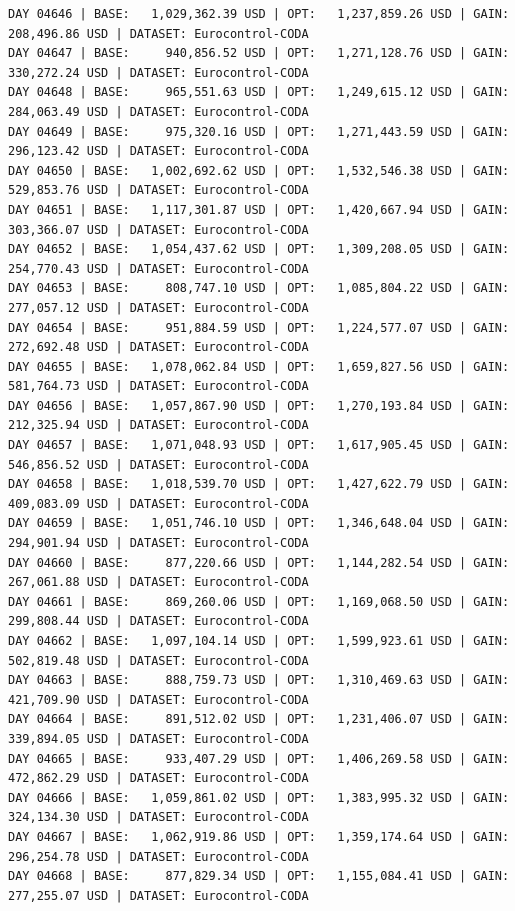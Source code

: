 \documentclass[11pt,a4paper]{article}
\begin{document}
\begin{verbatim}
DAY 04646 | BASE:   1,029,362.39 USD | OPT:   1,237,859.26 USD | GAIN: 208,496.86 USD | DATASET: Eurocontrol-CODA
DAY 04647 | BASE:     940,856.52 USD | OPT:   1,271,128.76 USD | GAIN: 330,272.24 USD | DATASET: Eurocontrol-CODA
DAY 04648 | BASE:     965,551.63 USD | OPT:   1,249,615.12 USD | GAIN: 284,063.49 USD | DATASET: Eurocontrol-CODA
DAY 04649 | BASE:     975,320.16 USD | OPT:   1,271,443.59 USD | GAIN: 296,123.42 USD | DATASET: Eurocontrol-CODA
DAY 04650 | BASE:   1,002,692.62 USD | OPT:   1,532,546.38 USD | GAIN: 529,853.76 USD | DATASET: Eurocontrol-CODA
DAY 04651 | BASE:   1,117,301.87 USD | OPT:   1,420,667.94 USD | GAIN: 303,366.07 USD | DATASET: Eurocontrol-CODA
DAY 04652 | BASE:   1,054,437.62 USD | OPT:   1,309,208.05 USD | GAIN: 254,770.43 USD | DATASET: Eurocontrol-CODA
DAY 04653 | BASE:     808,747.10 USD | OPT:   1,085,804.22 USD | GAIN: 277,057.12 USD | DATASET: Eurocontrol-CODA
DAY 04654 | BASE:     951,884.59 USD | OPT:   1,224,577.07 USD | GAIN: 272,692.48 USD | DATASET: Eurocontrol-CODA
DAY 04655 | BASE:   1,078,062.84 USD | OPT:   1,659,827.56 USD | GAIN: 581,764.73 USD | DATASET: Eurocontrol-CODA
DAY 04656 | BASE:   1,057,867.90 USD | OPT:   1,270,193.84 USD | GAIN: 212,325.94 USD | DATASET: Eurocontrol-CODA
DAY 04657 | BASE:   1,071,048.93 USD | OPT:   1,617,905.45 USD | GAIN: 546,856.52 USD | DATASET: Eurocontrol-CODA
DAY 04658 | BASE:   1,018,539.70 USD | OPT:   1,427,622.79 USD | GAIN: 409,083.09 USD | DATASET: Eurocontrol-CODA
DAY 04659 | BASE:   1,051,746.10 USD | OPT:   1,346,648.04 USD | GAIN: 294,901.94 USD | DATASET: Eurocontrol-CODA
DAY 04660 | BASE:     877,220.66 USD | OPT:   1,144,282.54 USD | GAIN: 267,061.88 USD | DATASET: Eurocontrol-CODA
DAY 04661 | BASE:     869,260.06 USD | OPT:   1,169,068.50 USD | GAIN: 299,808.44 USD | DATASET: Eurocontrol-CODA
DAY 04662 | BASE:   1,097,104.14 USD | OPT:   1,599,923.61 USD | GAIN: 502,819.48 USD | DATASET: Eurocontrol-CODA
DAY 04663 | BASE:     888,759.73 USD | OPT:   1,310,469.63 USD | GAIN: 421,709.90 USD | DATASET: Eurocontrol-CODA
DAY 04664 | BASE:     891,512.02 USD | OPT:   1,231,406.07 USD | GAIN: 339,894.05 USD | DATASET: Eurocontrol-CODA
DAY 04665 | BASE:     933,407.29 USD | OPT:   1,406,269.58 USD | GAIN: 472,862.29 USD | DATASET: Eurocontrol-CODA
DAY 04666 | BASE:   1,059,861.02 USD | OPT:   1,383,995.32 USD | GAIN: 324,134.30 USD | DATASET: Eurocontrol-CODA
DAY 04667 | BASE:   1,062,919.86 USD | OPT:   1,359,174.64 USD | GAIN: 296,254.78 USD | DATASET: Eurocontrol-CODA
DAY 04668 | BASE:     877,829.34 USD | OPT:   1,155,084.41 USD | GAIN: 277,255.07 USD | DATASET: Eurocontrol-CODA

\end{verbatim}
\end{document}
